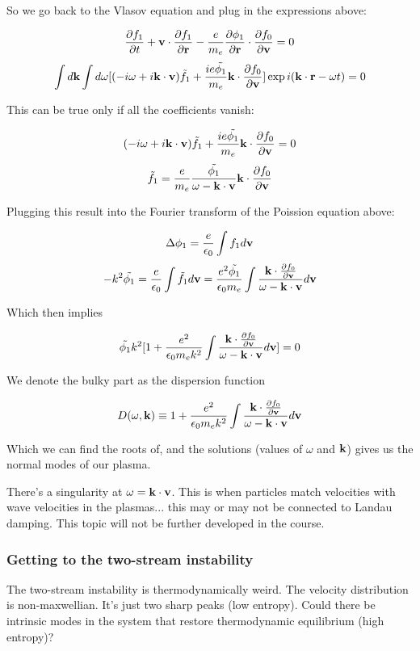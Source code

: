 \documentclass[PlasmaNotes.tex]{subfiles}
\begin{document}
So we go back to the Vlasov equation and plug in the expressions above:

\[\frac{\partial f_1}{\partial t} + \mathbf{v} \cdot \frac{\partial f_1}{\partial \mathbf{r}} - \frac{e}{m_e}\frac{\partial \phi_1}{\partial \mathbf{r}} \cdot \frac{\partial f_0}{\partial \mathbf{v}} = 0\]
\[\int d\mathbf{k} \int d\omega [(-i\omega + i \mathbf{k} \cdot \mathbf{v}) \tilde{f_1} + \frac{i e \tilde{\phi_1}}{m_e} \mathbf{k} \cdot \frac{\partial f_0}{\partial \mathbf{v}}]\exp{i(\ensuremath{\mathbf{k}} \cdot \ensuremath{\mathbf{r}} - \omega t)} = 0 \]

This can be true only if all the coefficients vanish:

\[ (-i\omega + i \mathbf{k} \cdot \mathbf{v}) \tilde{f_1} + \frac{i e \tilde{\phi_1}}{m_e} \mathbf{k} \cdot \frac{\partial f_0}{\partial \mathbf{v}} = 0 \]
\[ \tilde{f_1} = \frac{e}{m_e} \frac{\tilde{\phi_1}}{\omega - \mathbf{k} \cdot \mathbf{v}} \mathbf{k} \cdot \frac{\partial f_0}{\partial \mathbf{v}} \]

Plugging this result into the Fourier transform of the Poission equation above:

\[ \Delta \phi_1 = \frac{e}{\epsilon_0} \int f_1 d\mathbf{v} \]
\[ -k^2 \tilde{\phi_1} = \frac{e}{\epsilon_0} \int \tilde{f_1} d\mathbf{v} =\frac{e^2 \tilde{\phi_1}}{\epsilon_0 m_e} \int \frac{\mathbf{k} \cdot \frac{\partial f_0}{\partial \mathbf{v}}}{\omega - \mathbf{k} \cdot \mathbf{v}} d\mathbf{v} \]

Which then implies

\[ \tilde{\phi_1} k^2 [ 1+ \frac{e^2}{\epsilon_0 m_e k^2} \int \frac{\mathbf{k} \cdot \frac{\partial f_0}{\partial \mathbf{v}}}{\omega - \mathbf{k} \cdot \mathbf{v}} d\mathbf{v} ] =0 \]

We denote the bulky part as the dispersion function

\[ D(\omega, \mathbf{k}) \equiv 1+ \frac{e^2}{\epsilon_0 m_e k^2} \int \frac{\mathbf{k} \cdot \frac{\partial f_0}{\partial \mathbf{v}}}{\omega - \mathbf{k} \cdot \mathbf{v}} d\mathbf{v} \]

Which we can find the roots of, and the solutions (values of $\omega$ and $\mathbf{k}$) gives us the normal modes of our plasma.

There's a singularity at $\omega = \mathbf{k} \cdot \mathbf{v}$. This is when particles match velocities with wave velocities in the plasmas... this may or may not be connected to Landau damping. This topic will not be further developed in the course.

\subsubsection{Getting to the two-stream instability}

The two-stream instability is thermodynamically weird. The velocity distribution is non-maxwellian.
It's just two sharp peaks (low entropy). Could there be intrinsic modes in the system that restore thermodynamic equilibrium (high entropy)?
\end{document}
